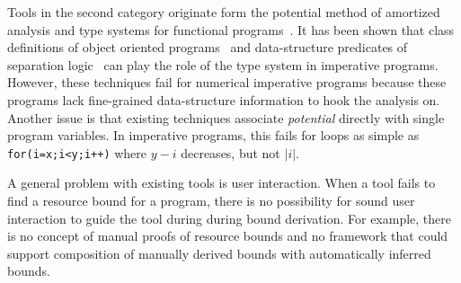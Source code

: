 \documentclass[nocopyrightspace,preprint,pldi]{sigplanconf-pldi15}
\begin{document}
Tools in the second category originate form the potential method of
amortized analysis and type systems for functional
programs~\cite{Jost03,HoffmannAH12}. It has been shown that class
definitions of object oriented programs~\cite{Jost06} and
data-structure predicates of separation logic~\cite{Atkey10} can play
the role of the type system in imperative programs. However, these
techniques fail for numerical imperative programs because these programs lack
fine-grained data-structure information to hook the analysis on.
Another issue is that existing techniques associate \emph{potential}
directly with single program variables.  In imperative programs, this
fails for loops as simple as \lstinline{for(i=x;i<y;i++)} where
$y - i$ decreases, but not $|i|$. %

A general problem with existing tools is user interaction. When a tool
fails to find a resource bound for a program, there is no possibility
for sound user interaction to guide the tool during during bound
derivation.
For example, there is no concept of manual proofs of
resource bounds and no framework that could support composition
of manually derived bounds with automatically inferred bounds.

\end{document}
